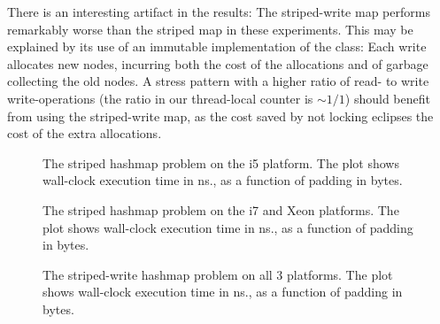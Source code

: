 There is an interesting artifact in the results: The striped-write map performs
remarkably worse than the striped map in these experiments. This may be
explained by its use of an immutable implementation of the 
class: Each write allocates new nodes, incurring both the cost of the
allocations and of garbage collecting the old nodes. A stress pattern with a
higher ratio of read- to write write-operations (the ratio in our thread-local
counter is $\sim 1/1$) should benefit from using the striped-write map, as the
cost saved by not locking eclipses the cost of the extra allocations.

\begin{figure}[hbpt]
\graphicspath{{plots/}}

\caption{The striped hashmap problem on the i5 platform. The plot shows
	wall-clock execution time in ns., as a function of padding in bytes.}
\label{fig:hashmap-striped-i5}
\end{figure}

\begin{figure}[hbpt]
\graphicspath{{plots/}}

\caption{The striped hashmap problem on the i7 and Xeon platforms. The plot shows
	wall-clock execution time in ns., as a function of padding in bytes.}
\label{fig:hashmap-striped-i7-xeon}
\end{figure}

\begin{figure}[hbpt]
\graphicspath{{plots/}}

\caption{The striped-write hashmap problem on all 3 platforms. The plot shows
	wall-clock execution time in ns., as a function of padding in bytes.}
\label{fig:hashmap-stripedwrite}
\end{figure}
